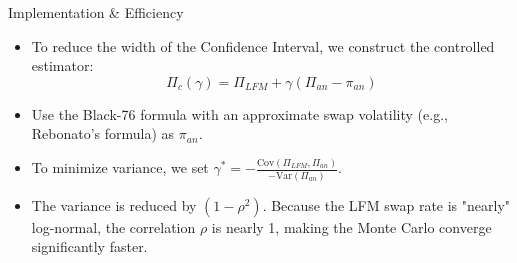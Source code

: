 \documentclass{beamer}
\begin{document}
\begin{frame}{Implementation \& Efficiency}
	\begin{itemize}
	\item To reduce the width of the Confidence Interval, we construct the controlled estimator:
	\begin{equation*}
		\Pi_c(\gamma) = \Pi_{LFM} + \gamma(\Pi_{an} - \pi_{an})
	\end{equation*}
	\item Use the Black-76 formula with an approximate swap volatility (e.g., Rebonato’s formula) as $\pi_{an}$.
	\item To minimize variance, we set $\gamma^*=-\frac{\text{Cov}(\Pi_{LFM}, \Pi_{an})}{-\text{Var}(\Pi_{an})}$. %
	\item The variance is reduced by $(1-\rho^2)$. Because the LFM swap rate is "nearly" log-normal, the correlation $\rho$ is nearly 1, making the Monte Carlo converge significantly faster.
	\end{itemize}
\end{frame}



%
%


\end{document}
